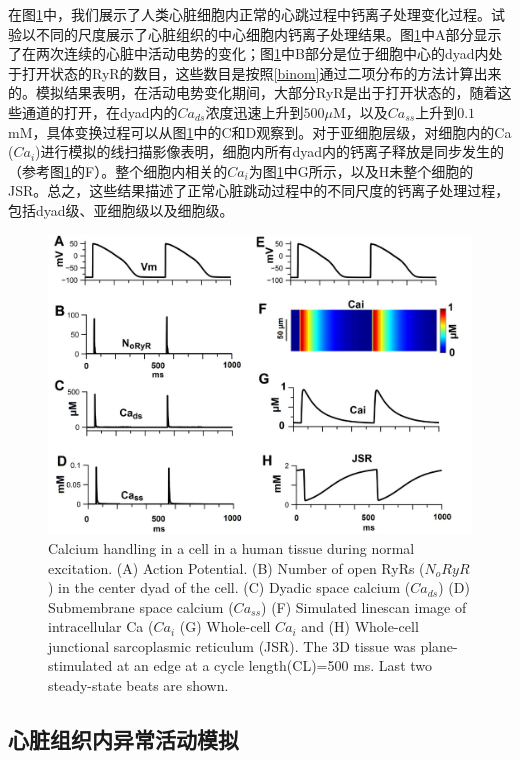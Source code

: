 在图\ref{fig:calciumcell}中，我们展示了人类心脏细胞内正常的心跳过程中钙离子处理变化过程。试验以不同的尺度展示了心脏组织的中心细胞内钙离子处理结果。图\ref{fig:calciumcell}中A部分显示了在两次连续的心脏中活动电势的变化；图\ref{fig:calciumcell}中B部分是位于细胞中心的dyad内处于打开状态的RyR的数目，这些数目是按照\ref{binom}通过二项分布的方法计算出来的。模拟结果表明，在活动电势变化期间，大部分RyR是出于打开状态的，随着这些通道的打开，在dyad内的$Ca_{ds}$浓度迅速上升到$500\mu$M，以及$Ca_{ss}$上升到$0.1$mM，具体变换过程可以从图\ref{fig:calciumcell}中的C和D观察到。对于亚细胞层级，对细胞内的Ca ($Ca_{i}$)进行模拟的线扫描影像表明，细胞内所有dyad内的钙离子释放是同步发生的（参考图\ref{fig:calciumcell}的F）。整个细胞内相关的$Ca_i$为图\ref{fig:calciumcell}中G所示，以及H未整个细胞的JSR。总之，这些结果描述了正常心脏跳动过程中的不同尺度的钙离子处理过程，包括dyad级、亚细胞级以及细胞级。

\begin{figure}[htb]
\includegraphics[width=\textwidth]{figs/calcium.pdf}
\caption{Calcium handling in a cell in a human tissue during normal excitation. (A) Action Potential. (B) Number of open RyRs ($N_oRyR$) in the center dyad of the cell. (C) Dyadic space calcium ($Ca_{ds}$) (D) Submembrane space calcium ($Ca_{ss}$) (F) Simulated linescan image of intracellular Ca ($Ca_i$ (G) Whole-cell $Ca_i$ and (H) Whole-cell junctional sarcoplasmic reticulum (JSR). The 3D tissue was plane-stimulated at an edge at a cycle length(CL)=500 ms. Last two steady-state beats are shown.}
\label{fig:calciumcell}
\end{figure}

\subsection{心脏组织内异常活动模拟}

